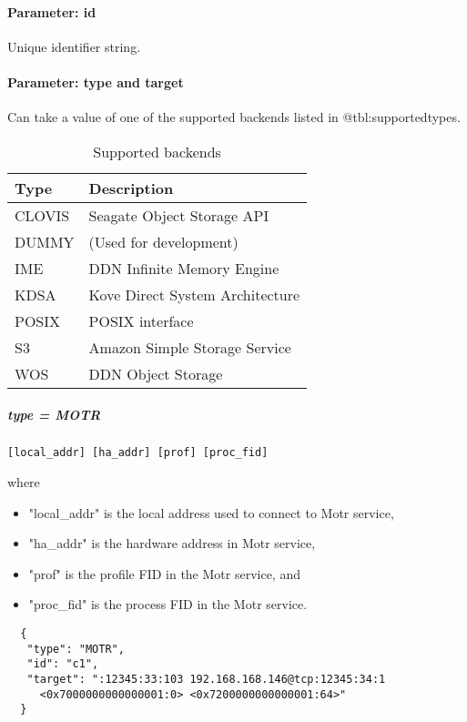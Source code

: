 \paragraph{Parameter: id}
Unique identifier string.


\paragraph{Parameter: type and target}
Can take a value of one of the supported backends listed in @tbl:supportedtypes.

\begin{table}[!h]
  \centering
  \begin{tabular}{ll}
    Type   & Description                     \\ 
    \hline
    CLOVIS & Seagate Object Storage API      \\ 
    DUMMY  & (Used for development)          \\ 
    IME    & DDN Infinite Memory Engine      \\ 
    KDSA   & Kove Direct System Architecture \\ 
    POSIX  & POSIX interface                 \\ 
    S3     & Amazon Simple Storage Service   \\ 
    WOS    & DDN Object Storage              \\ 
  \end{tabular}
  \caption{Supported backends}%
  \label{tab:supported_backends}
\end{table}

\subparagraph{type = MOTR}

\begin{lstlisting} 
[local_addr] [ha_addr] [prof] [proc_fid]
\end{lstlisting}

  where
  \begin{itemize}
    \item "local\_addr" is the local address used to connect to Motr service, 
    \item "ha\_addr" is the hardware address in Motr service, 
    \item "prof" is the profile FID in the Motr service, and
    \item "proc\_fid" is the process FID in the Motr service.
  \end{itemize}
  
  \begin{lstlisting} 
  {
   "type": "MOTR",
   "id": "c1",
   "target": ":12345:33:103 192.168.168.146@tcp:12345:34:1 
     <0x7000000000000001:0> <0x7200000000000001:64>"
  }
  \end{lstlisting}
        
